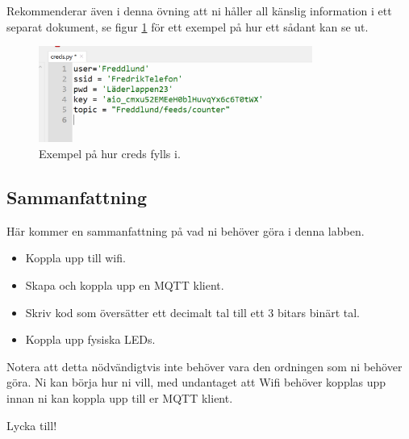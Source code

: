 \documentclass{article}
\begin{document}
Rekommenderar även i denna övning att ni håller all känslig information i ett separat dokument, se figur \ref{fig:my_label} för ett exempel på hur ett sådant kan se ut.

\begin{figure}[H]
    \centering
    \includegraphics[width=0.8\textwidth]{bilder/exempelwifi.png}
    \caption{Exempel på hur creds fylls i.}
    \label{fig:my_label}
\end{figure}
\newpage
\subsection*{Sammanfattning}
Här kommer en sammanfattning på vad ni behöver göra i denna labben.
\begin{itemize}
    \item Koppla upp till wifi.
    \item Skapa och koppla upp en MQTT klient.
    \item Skriv kod som översätter ett decimalt tal till ett 3 bitars binärt tal.
    \item Koppla upp fysiska LEDs.
\end{itemize}
Notera att detta nödvändigtvis inte behöver vara den ordningen som ni behöver göra. Ni kan börja hur ni vill, med undantaget att Wifi behöver kopplas upp innan ni kan koppla upp till er MQTT klient.

Lycka till!
\end{document}
